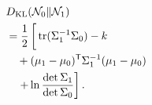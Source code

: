 \begin{equation}
 \begin{split}
 &D_{\mathrm{KL}}(\mathcal N_0
     \Vert\mathcal N_1)\\
 &=\frac12\left[
   \vphantom{\ln\frac{\det\Sigma_1}
                        {\det\Sigma_0}}
   \operatorname{tr}(
     \Sigma_1^{-1}\Sigma_0)-k\right.\\
 &\quad+(\mu_1-\mu_0)^{\mathsf T}
   \Sigma_1^{-1}(\mu_1-\mu_0)\\
 &\quad\left.+\ln\frac{\det\Sigma_1}
                  {\det\Sigma_0}
   \right].
 \end{split}
\end{equation}
